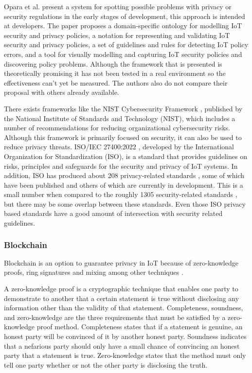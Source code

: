Opara et al. \cite{opara2022framework} present a system for spotting possible
problems with privacy or security regulations in the early stages of development,
this approach is intended at developers. The paper proposes a domain-specific
ontology for modelling IoT security and privacy policies, a notation for
representing and validating IoT security and privacy policies, a set of
guidelines and rules for detecting IoT policy errors, and a tool for visually
modelling and capturing IoT security policies and discovering policy problems.
Although the framework that is presented is theoretically promising it has
not been tested in a real environment so the effectiveness can't yet be
measured. The authors also do not compare their proposal with others already
available.

There exists frameworks like the NIST Cybersecurity Framework \cite{barrett2018framework},
published by the National Institute of Standards and Technology (NIST),
which includes a number of recommendations for reducing organizational
cybersecurity risks. Although this framework is primarily focused on
security, it can also be used to reduce privacy threats.
ISO/IEC 27400:2022 \cite{iso2022cybersecurity}, developed by the International
Organization for Standardization (ISO), is a standard that provides
guidelines on risks, principles and safeguards for the security and
privacy of IoT systems. In addition, ISO has produced about 208 privacy-related
standards \cite{iso2023privacysearch}, some of which have been published
and others of which are currently in development. This is a small number
when compared to the roughly 1305 security-related standards \cite{iso2023securitysearch},
but there may be some overlap between these standards. Even those ISO privacy
based standards have a good amount of intersection with security related
guidelines.

\subsubsection{Blockchain}

Blockchain is an option to guarantee privacy in IoT because of zero-knowledge
proofs, ring signatures \cite{mercer2016privacy} and mixing
among other techniques \cite{zhang2019security}.

A zero-knowledge proof is a cryptographic technique that enables one party
to demonstrate to another that a certain statement is true without disclosing
any information other than the validity of that statement. Completeness, soundness,
and zero-knowledge are the three requirements that must be satisfied by a
zero-knowledge proof method. Completeness states that if a
statement is genuine, an honest party will be convinced of it by another honest
party. Soundness indicates that a nefarious party should only have a small chance
of convincing an honest party that a statement is true. Zero-knowledge states
that the method must only tell one party whether or not the other party is
disclosing the truth.

